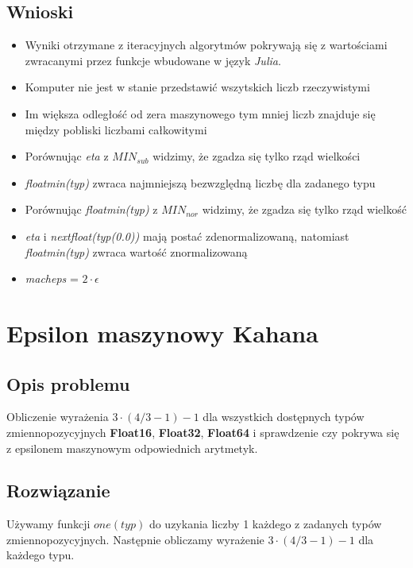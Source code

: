 \documentclass[a4paper]{article}
\begin{document}
    \subsection{Wnioski}
        \begin{itemize}
            \item Wyniki otrzymane z iteracyjnych algorytmów pokrywają się z wartościami zwracanymi przez funkcje wbudowane w język \emph{Julia}.
            \item Komputer nie jest w stanie przedstawić wszytskich liczb rzeczywistymi
            \item Im większa odległość od zera maszynowego tym mniej liczb znajduje się między pobliski liczbami całkowitymi
            \item Porównując \emph{eta} z $MIN_{sub}$ widzimy, że zgadza się tylko rząd wielkości
            \item \emph{floatmin(typ)} zwraca najmniejszą bezwzględną liczbę dla zadanego typu
            \item Porównując \emph{floatmin(typ)} z $MIN_{nor}$ widzimy, że zgadza się tylko rząd wielkość
            \item \emph{eta} i \emph{nextfloat(typ(0.0))} mają postać zdenormalizowaną, natomiast \emph{floatmin(typ)} zwraca wartość znormalizowaną
            \item \emph{macheps} = \(2 \cdot  \epsilon\)
            
        \end{itemize}

\section{Epsilon maszynowy Kahana}
    \subsection{Opis problemu}
        Obliczenie wyrażenia \(3 \cdot (4/3 - 1) - 1\) dla wszystkich dostępnych typów zmiennopozycyjnych \textbf{Float16}, \textbf{Float32}, \textbf{Float64} i sprawdzenie czy pokrywa się z epsilonem maszynowym odpowiednich arytmetyk.
        
    \subsection{Rozwiązanie}
    Używamy funkcji \(one(typ)\) do uzykania liczby 1 każdego z zadanych typów zmiennopozycyjnych.
    Następnie obliczamy wyrażenie \(3 \cdot (4/3 - 1) - 1\) dla każdego typu.
    
\end{document}
